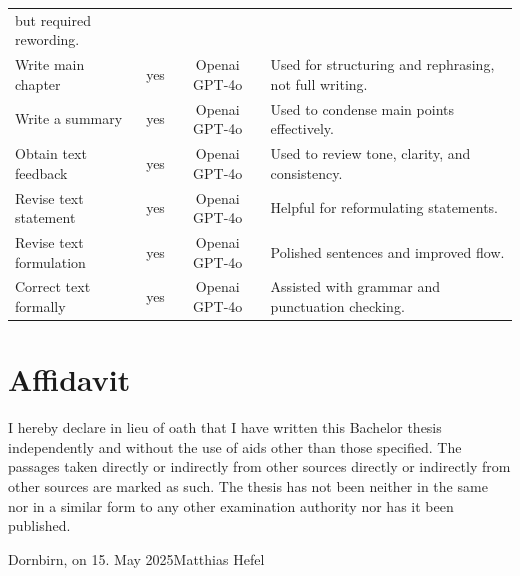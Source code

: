 \documentclass[a4paper,12pt,twoside]{scrreprt}
\begin{document}
\begin{table}[htbp]
\begin{tabular}{|p{5.2cm}|c|c|p{6.2cm}|}
    but required rewording.
    \\
    Write main chapter                     & yes                    & Openai
    GPT-4o
                                           & Used for structuring
    and rephrasing, not full writing.
    \\
    Write a summary                        & yes                    & Openai
    GPT-4o
                                           & Used to condense main
    points effectively.
    \\
    Obtain text feedback                   & yes                    & Openai
    GPT-4o
                                           & Used to review tone,
    clarity, and consistency.
    \\
    Revise text statement                  & yes                    & Openai
    GPT-4o
                                           & Helpful for
    reformulating statements.
    \\
    Revise text formulation                & yes                    & Openai
    GPT-4o
                                           & Polished sentences and
    improved flow.
    \\
    Correct text formally                  & yes                    & Openai
    GPT-4o
                                           & Assisted with grammar
    and punctuation checking.
    \\
    \hline
  \end{tabular}
\end{table}

\chapter*{Affidavit}
I hereby declare in lieu of oath that I have written this Bachelor
thesis independently and without the use of aids other than those specified.
The passages taken directly or indirectly from other sources
directly or indirectly from other sources are marked as such. The thesis has
not been
neither in the same nor in a similar form to any other examination authority
nor has it been published.

\vspace{3cm}
\noindent
Dornbirn, on 15. May 2025\hfill Matthias Hefel
\end{document}
